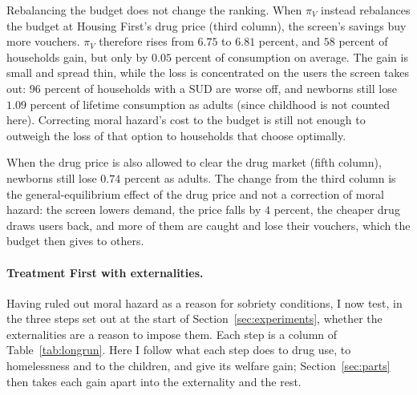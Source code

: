\documentclass[10pt]{article}
\begin{document}
Rebalancing the budget does not change the ranking. When $\pi_V$ instead rebalances the budget at Housing First's drug price (third column), the screen's savings buy more vouchers. $\pi_V$ therefore rises from $6.75$ to $6.81$ percent, and $58$ percent of households gain, but only by $0.05$ percent of consumption on average. The gain is small and spread thin, while the loss is concentrated on the users the screen takes out: $96$ percent of households with a SUD are worse off, and newborns still lose $1.09$ percent of lifetime consumption as adults (since childhood is not counted here). Correcting moral hazard's cost to the budget is still not enough to outweigh the loss of that option to households that choose optimally.

When the drug price is also allowed to clear the drug market (fifth column), newborns still lose $0.74$ percent as adults. The change from the third column is the general-equilibrium effect of the drug price and not a correction of moral hazard: the screen lowers demand, the price falls by $4$ percent, the cheaper drug draws users back, and more of them are caught and lose their vouchers, which the budget then gives to others.

\paragraph{Treatment First with externalities.} Having ruled out moral hazard as a reason for sobriety conditions, I now test, in the three steps set out at the start of Section~\ref{sec:experiments}, whether the externalities are a reason to impose them. Each step is a column of Table~\ref{tab:longrun}. Here I follow what each step does to drug use, to homelessness and to the children, and give its welfare gain; Section~\ref{sec:parts} then takes each gain apart into the externality and the rest.
\end{document}
